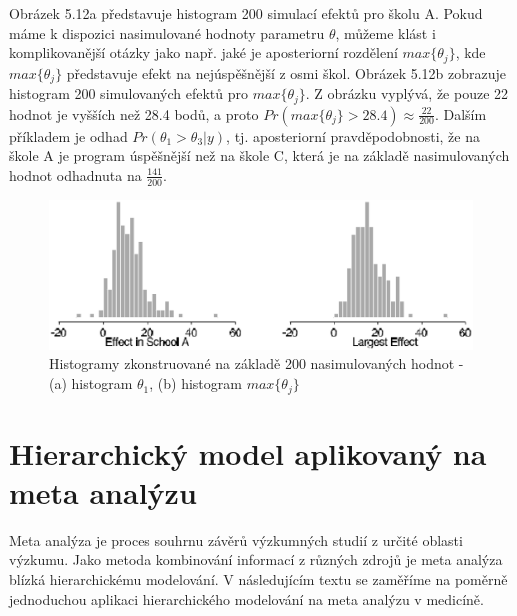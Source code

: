 Obrázek 5.12a představuje histogram 200 simulací efektů pro školu A. Pokud máme k dispozici nasimulované hodnoty parametru $\theta$, můžeme klást i komplikovanější otázky jako např. jaké je aposteriorní rozdělení $max\{\theta_j\}$, kde $max\{\theta_j\}$ představuje efekt na nejúspěšnější z osmi škol. Obrázek 5.12b zobrazuje histogram 200 simulovaných efektů pro $max\{\theta_j\}$. Z obrázku vyplývá, že pouze 22 hodnot je vyšších než 28.4 bodů, a proto $Pr(max\{\theta_j\} > 28.4) \approx \frac{22}{200}$. Dalším příkladem je odhad $Pr(\theta_1 > \theta_3 | y)$, tj. aposteriorní pravděpodobnosti, že na škole A je program úspěšnější než na škole C, která je na základě nasimulovaných hodnot odhadnuta na $\frac{141}{200}$.
\begin{figure}[htp]
\centering
\includegraphics[scale = 0.45]{pictures/fig_5_8.eps}
\caption{Histogramy zkonstruované na základě 200 nasimulovaných hodnot - (a) histogram $\theta_1$, (b) histogram $max\{\theta_j\}$}
\label{fig_5_8}
\end{figure}

\section{Hierarchický model aplikovaný na meta analýzu}

Meta analýza je proces souhrnu závěrů výzkumných studií z určité oblasti výzkumu. Jako metoda kombinování informací z různých zdrojů je meta analýza blízká hierarchickému modelování. V následujícím textu se zaměříme na poměrně jednoduchou aplikaci hierarchického modelování na meta analýzu v medicíně.

